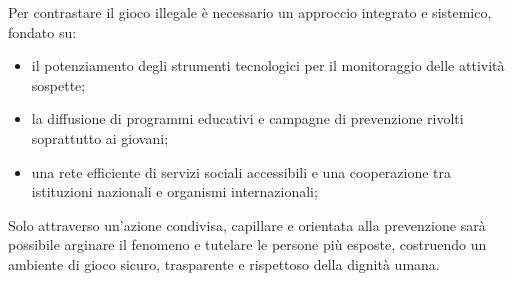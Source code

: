 \documentclass[a4paper,12pt]{article}
\begin{document}
Per contrastare il gioco illegale è necessario un approccio integrato e sistemico, fondato su:

\begin{itemize}
\item il potenziamento degli strumenti tecnologici per il monitoraggio delle attività sospette;
\item la diffusione di programmi educativi e campagne di prevenzione rivolti soprattutto ai giovani;
\item una rete efficiente di servizi sociali accessibili e una cooperazione tra istituzioni nazionali e organismi internazionali;
\end{itemize}

Solo attraverso un’azione condivisa, capillare e orientata alla prevenzione sarà possibile arginare il fenomeno e tutelare le persone più esposte, costruendo un ambiente di gioco sicuro, trasparente e rispettoso della dignità umana.
\end{document}
